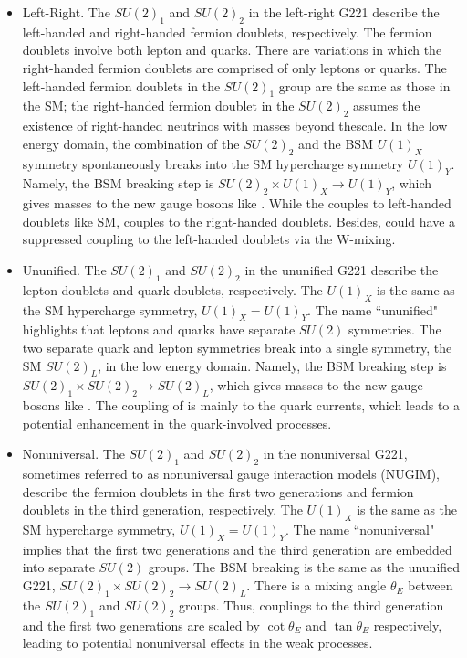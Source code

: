 \begin{itemize}
    \item Left-Right. The $SU(2)_1$ and $SU(2)_2$ in the left-right G221 describe the left-handed and right-handed fermion doublets, respectively. The fermion doublets involve both lepton and quarks. There are variations in which the right-handed fermion doublets are comprised of only leptons or quarks. The left-handed fermion doublets in the $SU(2)_1$ group are the same as those in the SM; the right-handed fermion doublet in the $SU(2)_2$ assumes the existence of right-handed neutrinos with masses beyond the\TeV scale. In the low energy domain, the combination of the $SU(2)_2$ and the BSM $U(1)_X$ symmetry spontaneously breaks into the SM hypercharge symmetry $U(1)_Y$. Namely, the BSM breaking step is $SU(2)_2 \times U(1)_X  \to U(1)_Y$, which gives masses to the new gauge bosons like \PWpr. While the \PW couples to left-handed doublets like SM, \PWpr couples to the right-handed doublets. Besides, \PWpr could have a suppressed coupling to the left-handed doublets via the W-\PWpr mixing. 
    
    \item Ununified. The $SU(2)_1$ and $SU(2)_2$ in the ununified G221 describe the lepton doublets and quark doublets, respectively. The $U(1)_X$ is the same as the SM hypercharge symmetry,  $U(1)_X=U(1)_Y$. The name ``ununified" highlights that leptons and quarks have separate $SU(2)$ symmetries. The two separate quark and lepton symmetries break into a single symmetry, the SM $SU(2)_L$, in the low energy domain. Namely, the BSM breaking step is $SU(2)_1 \times SU(2)_2 \to SU(2)_L$, which gives masses to the new gauge bosons like \PWpr. The coupling of \PWpr is mainly to the quark currents, which leads to a potential enhancement in the quark-involved processes.

    \item Nonuniversal. The $SU(2)_1$ and $SU(2)_2$ in the nonuniversal G221, sometimes referred to as nonuniversal gauge interaction models (NUGIM), describe the fermion doublets in the first two generations and fermion doublets in the third generation, respectively. The $U(1)_X$ is the same as the SM hypercharge symmetry,  $U(1)_X=U(1)_Y$. The name ``nonuniversal" implies that the first two generations and the third generation are embedded into separate $SU(2)$ groups. The BSM breaking is the same as the ununified G221, $SU(2)_1 \times SU(2)_2 \to SU(2)_L$. There is a mixing angle $\theta_E$ between the $SU(2)_1$ and $SU(2)_2$ groups. Thus, \PWpr couplings to the third generation and the first two generations are scaled by $\cot \theta_E$ and $\tan \theta_E$ respectively, leading to potential nonuniversal effects in the weak processes.
\end{itemize}




